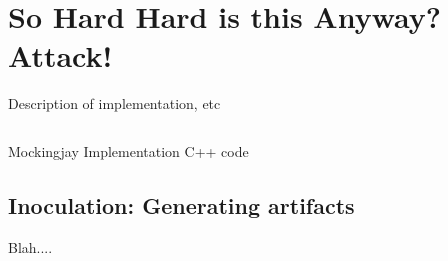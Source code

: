 \section{So Hard Hard is this Anyway?  Attack!}

Description of implementation, etc

\begin{listing}[!ht]
\inputminted{c++}{tex/code/mockingjay.cpp}
\caption{Mockingjay Implementation C++ code}
\label{listing:1}
\end{listing}

\subsection{Inoculation: Generating artifacts}

Blah....